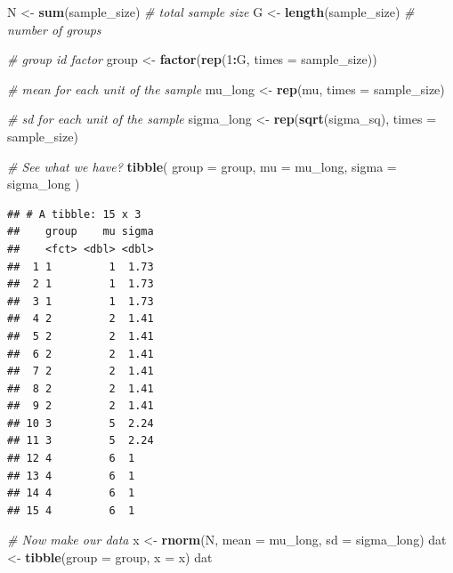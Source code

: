 \documentclass[
]{book}
\newenvironment{Shaded}{\begin{snugshade}}{\end{snugshade}}
\newcommand{\AttributeTok}[1]{\textcolor[rgb]{0.13,0.29,0.53}{#1}}
\newcommand{\CommentTok}[1]{\textcolor[rgb]{0.56,0.35,0.01}{\textit{#1}}}
\newcommand{\DecValTok}[1]{\textcolor[rgb]{0.00,0.00,0.81}{#1}}
\newcommand{\FunctionTok}[1]{\textcolor[rgb]{0.13,0.29,0.53}{\textbf{#1}}}
\newcommand{\NormalTok}[1]{#1}
\newcommand{\OtherTok}[1]{\textcolor[rgb]{0.56,0.35,0.01}{#1}}
\newcommand{\SpecialCharTok}[1]{\textcolor[rgb]{0.81,0.36,0.00}{\textbf{#1}}}
\begin{document}
\begin{Shaded}
\begin{Highlighting}[]
\NormalTok{N }\OtherTok{\textless{}{-}} \FunctionTok{sum}\NormalTok{(sample\_size) }\CommentTok{\# total sample size}
\NormalTok{G }\OtherTok{\textless{}{-}} \FunctionTok{length}\NormalTok{(sample\_size) }\CommentTok{\# number of groups}

\CommentTok{\# group id factor}
\NormalTok{group }\OtherTok{\textless{}{-}} \FunctionTok{factor}\NormalTok{(}\FunctionTok{rep}\NormalTok{(}\DecValTok{1}\SpecialCharTok{:}\NormalTok{G, }\AttributeTok{times =}\NormalTok{ sample\_size))}

\CommentTok{\# mean for each unit of the sample}
\NormalTok{mu\_long }\OtherTok{\textless{}{-}} \FunctionTok{rep}\NormalTok{(mu, }\AttributeTok{times =}\NormalTok{ sample\_size) }

\CommentTok{\# sd for each unit of the sample}
\NormalTok{sigma\_long }\OtherTok{\textless{}{-}} \FunctionTok{rep}\NormalTok{(}\FunctionTok{sqrt}\NormalTok{(sigma\_sq), }\AttributeTok{times =}\NormalTok{ sample\_size) }

\CommentTok{\# See what we have?}
\FunctionTok{tibble}\NormalTok{( }\AttributeTok{group =}\NormalTok{ group, }\AttributeTok{mu =}\NormalTok{ mu\_long, }\AttributeTok{sigma =}\NormalTok{ sigma\_long )}
\end{Highlighting}
\end{Shaded}

\begin{verbatim}
## # A tibble: 15 x 3
##    group    mu sigma
##    <fct> <dbl> <dbl>
##  1 1         1  1.73
##  2 1         1  1.73
##  3 1         1  1.73
##  4 2         2  1.41
##  5 2         2  1.41
##  6 2         2  1.41
##  7 2         2  1.41
##  8 2         2  1.41
##  9 2         2  1.41
## 10 3         5  2.24
## 11 3         5  2.24
## 12 4         6  1   
## 13 4         6  1   
## 14 4         6  1   
## 15 4         6  1
\end{verbatim}

\begin{Shaded}
\begin{Highlighting}[]
\CommentTok{\# Now make our data}
\NormalTok{x }\OtherTok{\textless{}{-}} \FunctionTok{rnorm}\NormalTok{(N, }\AttributeTok{mean =}\NormalTok{ mu\_long, }\AttributeTok{sd =}\NormalTok{ sigma\_long)}
\NormalTok{dat }\OtherTok{\textless{}{-}} \FunctionTok{tibble}\NormalTok{(}\AttributeTok{group =}\NormalTok{ group, }\AttributeTok{x =}\NormalTok{ x)}
\NormalTok{dat}
\end{Highlighting}
\end{Shaded}
\end{document}
